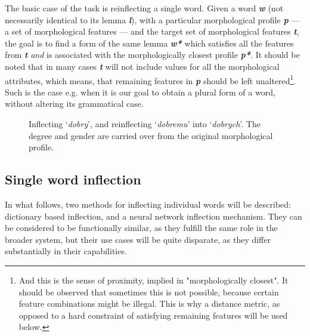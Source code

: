\documentclass[12pt]{article}
\newcommand{\inlinegloss}[1]{`\textit{#1}'}
\newcommand{\symbolic}[1]{\textit{\textbf{#1}}}
\begin{document}
The basic case of the task is reinflecting a single word. Given a word \symbolic{w} (not necessarily identical to its lemma \symbolic{l}), with a particular morphological profile \symbolic{p} --- a set of morphological features --- and the target set of morphological features \symbolic{t}, the goal is to find a form of the same lemma \symbolic{w*} which satisfies all the features from \symbolic{t} \textit{and} is associated with the morphologically closest profile \symbolic{p*}. It should be noted that in many cases \symbolic{t} will not include values for all the morphological attributes, which means, that remaining features in \symbolic{p} should be left unaltered\footnote{And this is the sense of proximity, implied in "morphologically closest". It should be observed that sometimes this is not possible, because certain feature combinations might be illegal. This is why a distance metric, as opposed to a hard constraint of satisfying remaining features will be used below.}. Such is the case e.g. when it is our goal to obtain a plural form of a word, without altering its grammatical case. 

\begin{figure}[H]
\centering
{}
	\caption{Inflecting \inlinegloss{dobry}, and reinflecting \inlinegloss{dobremu} into \inlinegloss{dobrych}. The degree and gender are carried over from the original morphological profile.} \label{fig:word_task}
\end{figure}

\subsection{Single word inflection}
In what follows, two methods for inflecting individual words will be described: dictionary based inflection, and a neural network inflection mechanism. They can be considered to be functionally similar, as they fulfill the same role in the broader system, but their use cases will be quite disparate, as they differ substantially in their capabilities.
\end{document}
